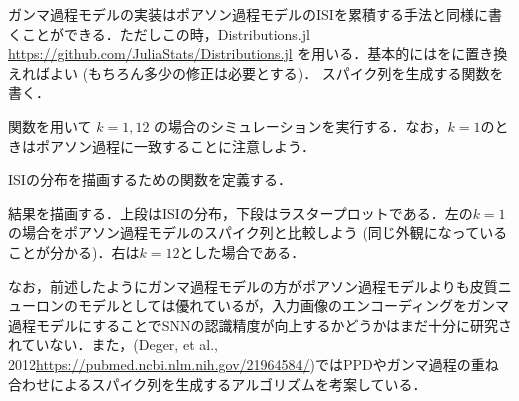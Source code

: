ガンマ過程モデルの実装はポアソン過程モデルのISIを累積する手法と同様に書くことができる．ただしこの時，Distributions.jl \url{https://github.com/JuliaStats/Distributions.jl} を用いる．基本的にはをに置き換えればよい (もちろん多少の修正は必要とする)．
スパイク列を生成する関数を書く．

 関数を用いて $k=1, 12$ の場合のシミュレーションを実行する．なお，$k=1$のときはポアソン過程に一致することに注意しよう．

ISIの分布を描画するための関数を定義する．

結果を描画する．上段はISIの分布，下段はラスタープロットである．左の$k=1$の場合をポアソン過程モデルのスパイク列と比較しよう (同じ外観になっていることが分かる)．右は$k=12$とした場合である．


なお，前述したようにガンマ過程モデルの方がポアソン過程モデルよりも皮質ニューロンのモデルとしては優れているが，入力画像のエンコーディングをガンマ過程モデルにすることでSNNの認識精度が向上するかどうかはまだ十分に研究されていない．また，(Deger, et al., 2012\url{https://pubmed.ncbi.nlm.nih.gov/21964584/})ではPPDやガンマ過程の重ね合わせによるスパイク列を生成するアルゴリズムを考案している．
